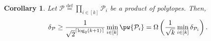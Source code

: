 \documentclass{article}
\makeatletter
\newcommand\linkofproof[1]{\textbf{of \cref{#1}. }\newtarget{proof:#1}}
\newcommand{\bigomegal}[1]{\Omega\left( #1 \right)}
\newcommand{\jmlrBlackBox}{\rule{1.5ex}{1.5ex}}
\newcommand{\jmlrQED}{\hfill\jmlrBlackBox\par\bigskip}
\providecommand{\proofname}{Proof}
\renewenvironment{proof}%
{%
 \par\noindent{\bfseries\upshape \proofname\ }%
}%
{\jmlrQED}
\newcommand{\mP}{\mathcal{P}}
\newcommand{\mQ}{\mathcal{Q}}
\newcommand{\verts}[1]{\mathcal{V}_{#1}}
\newcommand{\conv}[1]{\mathsf{conv}\left(#1\right)}
\newcommand{\faces}[1]{{\mathsf{faces}^\ast}\left(#1\right)}
\newcommand{\dist}[1]{\mathsf{dist}\left(#1\right)}
\DeclarePairedDelimiter\ceil{\lceil}{\rceil}
\newcommand{\defi}{\stackrel{\mathrm{\scriptscriptstyle def}}{=}}
\newtheorem{corollary}[theorem]{Corollary}
\newcommand{\gabrev}[1]{\textcolor{black}{#1}}
\newcommand\newtarget[2]{\Hy@raisedlink{\hypertarget{#1}{}}#2}
\makeatother
\begin{document}
%
%
%
%
%
%
\begin{corollary}\label{cor:pyr_width_lb_for_k_polytopes}
Let $\mathcal{P} \defi \prod_{i\in[k]} \mathcal{P}_i$ be a product of polytopes. Then,
\[
\delta_\mathcal{P} \geq \frac{1}{\sqrt{2}^{\ceil{\log_2 (k+1)}}} \min_{i \in [k]} \pw{\mP_i} =\bigomegal{\frac{1}{\sqrt{k}}\min_{i\in[k]} \delta_{\mathcal{P}_i}}.
\]
\end{corollary}
\end{document}
